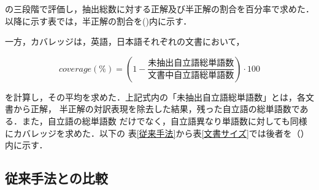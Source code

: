 \vspace{2mm}

\noindent
の三段階で評価し，抽出総数に対する正解及び半正解の割合を百分率で求めた．
以降に示す表では，半正解の割合を()内に示す．

一方，カバレッジは，英語，日本語それぞれの文書において，


\[ coverage(\%) = ( 1- \frac{未抽出自立語総単語数}{文書中自立語総単語数}) \cdot 100 \]

\noindent
を計算し，その平均を求めた．上記式内の「未抽出自立語総単語数」とは，各文書から正解，
半正解の対訳表現を除去した結果，残った自立語の総単語数である．また，自立語の総単語数
だけでなく，自立語異なり単語数に対しても同様にカバレッジを求めた．以下の
表\ref{従来手法}から表\ref{文書サイズ}では後者を（）内に示す．

\subsection{従来手法との比較}
\label{従来手法の実験}


